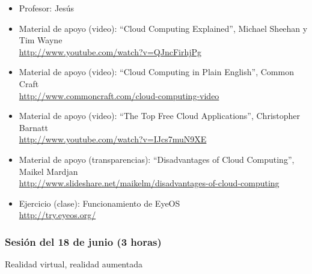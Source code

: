 \documentclass[a4paper,12pt]{article}
\begin{document}
\begin{itemize}
\item Profesor: Jesús
\item Material de apoyo (video): ``Cloud Computing Explained'', Michael Sheehan y Tim Wayne\\
  \url{http://www.youtube.com/watch?v=QJncFirhjPg}
\item Material de apoyo (video): ``Cloud Computing in Plain English'', Common Craft \\
\url{http://www.commoncraft.com/cloud-computing-video}
\item Material de apoyo (video): ``The Top Free Cloud Applications'', Christopher Barnatt \\
\url{http://www.youtube.com/watch?v=IJcs7muN9XE}
\item Material de apoyo (transparencias): ``Disadvantages of Cloud Computing'', Maikel Mardjan \\
  \url{http://www.slideshare.net/maikelm/disadvantages-of-cloud-computing}
\item Ejercicio (clase): Funcionamiento de EyeOS \\
  \url{http://try.eyeos.org/}
\end{itemize}
\subsubsection{Sesión del 18 de junio (3 horas)}

Realidad virtual, realidad aumentada
\end{document}
